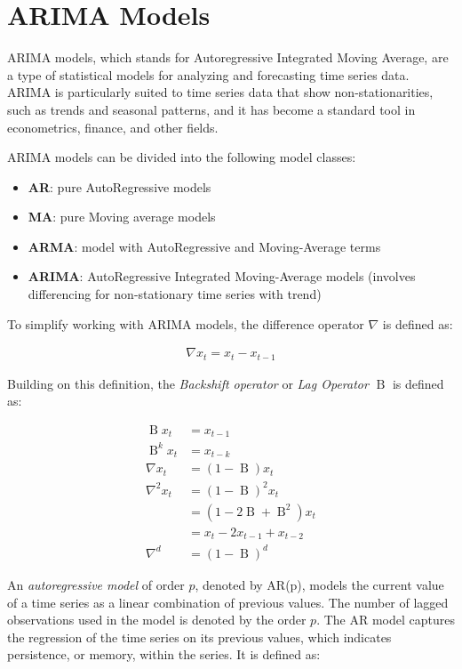 \section{ARIMA Models}

ARIMA models, which stands for Autoregressive Integrated Moving Average, are a type of statistical models for analyzing and forecasting time series data. ARIMA is particularly suited to time series data that show non-stationarities, such as trends and seasonal patterns, and it has become a standard tool in econometrics, finance, and other fields.

ARIMA models can be divided into the following model classes:
\begin{itemize}
  \item \textbf{AR}: pure AutoRegressive models
  \item \textbf{MA}: pure Moving average models
  \item \textbf{ARMA}: model with AutoRegressive and Moving-Average terms
  \item \textbf{ARIMA}: AutoRegressive Integrated Moving-Average models (involves differencing for non-stationary time series with trend)
\end{itemize}

To simplify working with ARIMA models, the difference operator $\nabla$ is defined as:

\begin{align*}\nabla x_t = x_t - x_{t-1}\end{align*}

\noindent Building on this definition, the \emph{Backshift operator} or \emph{Lag Operator} $\operatorname{B}$ is defined as:

\begin{align*}\operatorname{B} x_t &= x_{t-1} \\
\operatorname{B}^k x_t &= x_{t-k} \\
\nabla x_t &= (1-\operatorname{B})x_t \\
\nabla^2 x_t &= (1-\operatorname{B})^2 x_t \\
 &= (1-2 \operatorname{B} + \operatorname{B}^2)x_t \\
 &= x_t - 2x_{t-1} + x_{t-2} \\
\nabla^d &= (1-\operatorname{B})^d
\end{align*}

An \emph{autoregressive model} of order $p$, denoted by AR(p), models the current value of a time series as a linear combination of previous values. The number of lagged observations used in the model is denoted by the order $p$. The AR model captures the regression of the time series on its previous values, which indicates persistence, or memory, within the series. It is defined as:

